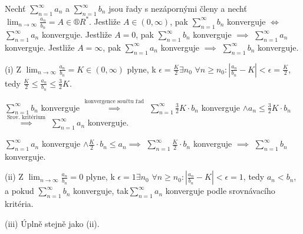 \documentclass[12pt]{article}                   %
\begin{document}
        \begin{veta}
            Nechť $\sum_{n=1}^∞ a_n$ a $\sum_{n=1}^∞ b_n$ jsou řady s nezápornými členy a nechť $\lim_{n \rightarrow ∞} \frac{a_n}{b_n} = A \in ®R^*$. Jestliže $A \in (0, ∞)$, pak $\sum_{n=1}^∞ b_n$ konverguje $\Leftrightarrow$ $\sum_{n=1}^∞ a_n$ konverguje. Jestliže $A = 0$, pak $\sum_{n=1}^∞ b_n$ konverguje $\implies$ $\sum_{n=1}^∞ a_n$ konverguje. Jestliže $A = ∞$, pak $\sum_{n=1}^∞ a_n$ konverguje $\implies$ $\sum_{n=1}^∞ b_n$ konverguje.

            \begin{dukazin}
                (i) Z $\lim_{n \rightarrow ∞} \frac{a_n}{b_n} = K \in (0, ∞)$ plyne, k $\epsilon = \frac{K}{2} \exists n_0$ $\forall n ≥ n_0: \left| \frac{a_n}{b_n} - K \right| < \epsilon = \frac{K}{2}$, tedy $\frac{K}{2} ≤ \frac{a_n}{b_n} ≤ \frac{3}{2}K$.

                $\sum_{n=1}^∞ b_n$ konverguje $\overset{\text{konvergence součtu řad}}{\implies}$ $\sum_{n=1}^∞ \frac{3}{2}K·b_n$ konverguje $\land a_n ≤ \frac{3}{2}K·b_n$ $\overset{\text{Srov. kritérium}}{\implies}$ $\sum_{n=1}^∞ a_n$ konverguje.

                $\sum_{n=1}^∞ a_n$ konverguje $\land \frac{K}{2}·b_n ≤ a_n \implies$ $\sum_{n=1}^∞ \frac{K}{2}·b_n$ konverguje $\implies$ $\sum_{n=1}^∞ b_n$ konverguje.

                (ii) Z $\lim_{n \rightarrow ∞} \frac{a_n}{b_n} = 0$ plyne, k $\epsilon = 1 \exists n_0$ $\forall n≥n_0: \left| \frac{a_n}{b_n} - K \right| < \epsilon = 1$, tedy $a_n < b_n$, a pokud $\sum_{n=1}^∞ b_n$ konverguje, tak$\sum_{n=1}^∞ a_n$ konverguje podle srovnávacího kritéria.

                (iii) Úplně stejně jako (ii).
            \end{dukazin}
        \end{veta}

\end{document}
